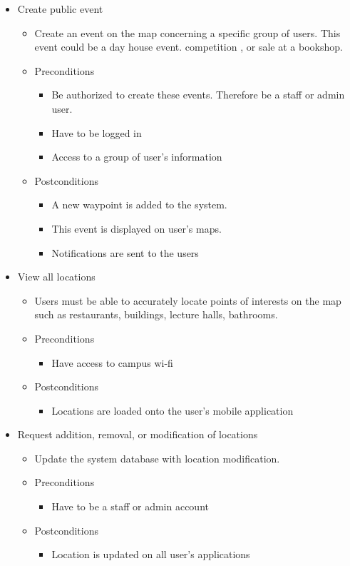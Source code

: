 \documentclass[12pt]{article}
\begin{document}
\begin{enumerate}
\begin{itemize}
				\item Create public event
				\begin{itemize}
					\item Create an event on the map concerning a specific group of users. This event could be a day house event. competition , or sale at a bookshop.
					\item Preconditions
					\begin{itemize}
						\item Be authorized to create these events. Therefore be a staff or admin user.
						\item Have to be logged in
						\item Access to a group of user’s information
					\end{itemize}
					\item Postconditions
					\begin{itemize}
						\item A new waypoint is added to the system.
						\item This event is displayed on user’s maps.
						\item Notifications are sent to the users
					\end{itemize}
				\end{itemize}
				
				\item View all locations
				\begin{itemize}
					\item Users must be able to accurately locate points of interests on the map such as restaurants, buildings, lecture halls, bathrooms.
					\item Preconditions
					\begin{itemize}
						\item Have access to campus wi-fi
					\end{itemize}
					\item Postconditions
					\begin{itemize}
						\item Locations are loaded onto the user’s mobile application
					\end{itemize}
				\end{itemize}
				
				\item Request addition, removal, or modification of locations
				\begin{itemize}
					\item Update the system database with location modification. 
					\item Preconditions
					\begin{itemize}
						\item Have to be a staff or admin account
					\end{itemize}
					\item Postconditions
					\begin{itemize}
						\item Location is updated on all user’s applications
					\end{itemize}
				\end{itemize}
				

\end{itemize}
\end{enumerate}
\end{document}
